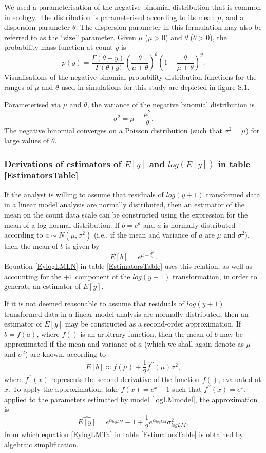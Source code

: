 \documentclass[]{article}
\begin{document}
We used a parameterisation of the negative binomial distribution that is
common in ecology. The distribution is parameterised according to its
mean \(\mu\), and a dispersion parameter \(\theta\). The dispersion
parameter in this formulation may also be referred to as the ``size''
parameter. Given \(\mu\) (\(\mu>0\)) and \(\theta\) (\(\theta>0\)), the
probability mass function at count \(y\) is \[
p(y)=\frac{\Gamma(\theta+y)}{\Gamma(\theta)y!}\left(\frac{\theta}{\mu+\theta}\right)^\theta\left(1-\frac{\theta}{\mu+\theta}\right)^y.
\] Visualisations of the negative binomial probability distribution
functions for the ranges of \(\mu\) and \(\theta\) used in simulations
for this study are depicted in figure S.1.

Parameterised via \(\mu\) and \(\theta\), the variance of the negative
binomial distribution is \[
\sigma^2 = \mu+\frac{\mu^2}{\theta}.
\] The negative binomial converges on a Poisson distribution (such that
\(\sigma^2 = \mu\)) for large values of \(\theta\).

\subsubsection{\texorpdfstring{Derivations of estimators of \(E[y]\) and
\(log(E[y])\) in table
\ref{EstimatorsTable}}{Derivations of estimators of E{[}y{]} and log(E{[}y{]}) in table }}\label{derivations-of-estimators-of-ey-and-logey-in-table}

If the analyst is willing to assume that residuals of \(log(y+1)\)
transformed data in a linear model analysis are normally distributed,
then an estimator of the mean on the count data scale can be constructed
using the expression for the mean of a log-normal distribution. If
\(b=e^a\) and \(a\) is normally distributed according to
\(a \sim N(\mu,\sigma^2)\) (i.e., if the mean and variance of \(a\) are
\(\mu\) and \(\sigma^2\)), then the mean of \(b\) is given by \[
E[b]=e^{\mu+\frac{\sigma^2}{2}}.
\] Equation \ref{EylogLMLN} in table \ref{EstimatorsTable} uses this
relation, as well as accounting for the \(+1\) component of the
\(log(y+1)\) transformation, in order to generate an estimator of
\(E[y]\).

If it is not deemed reasonable to assume that residuals of \(log(y+1)\)
transformed data in a linear model analysis are normally distributed,
then an estimator of \(E[y]\) may be constructed as a second-order
approximation. If \(b=f(a)\), where \(f()\) is an arbitrary function,
then the mean of \(b\) may be approximated if the mean and variance of
\(a\) (which we shall again denote as \(\mu\) and \(\sigma^2\)) are
known, according to \[
E[b] \approx f(\mu) + \frac{1}{2} f^{\prime\prime}(\mu)\sigma^2,
\] where \(f^{\prime\prime}(x)\) represents the second derivative of the
function \(f()\), evaluated at \(x\). To apply the approximation, take
\(f(x)=e^x-1\) such that \(f^{\prime\prime}(x)=e^x\), applied to the
parameters estimated by model \ref{logLMmodel}, the approximation is \[
\widehat{E[y]}=e^{\alpha_{logLM}}-1+\frac{1}{2}e^{\alpha_{logLM}}\sigma^2_{logLM},
\] from which equation \ref{EylogLMTa} in table \ref{EstimatorsTable} is
obtained by algebraic simplification.
\end{document}
